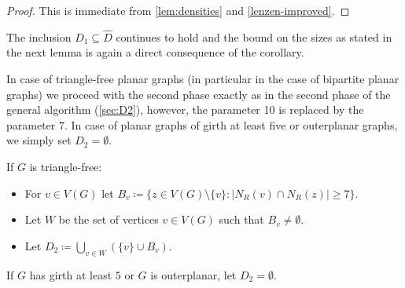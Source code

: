 \begin{proof}
This is immediate from \cref{lem:densities} and \cref{lenzen-improved}.
\end{proof}

The inclusion $D_1\subseteq \hat D$ continues to hold and the bound
on the sizes as stated in the next lemma is again a direct consequence of the corollary.

\smallskip


In case of triangle-free planar graphs (in particular in the case of bipartite
planar graphs) we proceed with the second phase exactly as in the second phase of
the general algorithm (\cref{sec:D2}), however, the parameter 10 is replaced by
the parameter $7$. In  case of planar graphs of girth at least five or outerplanar
graphs, we simply set $D_2=\emptyset$.

\begin{tcolorbox}[colback=red!5!white,colframe=red!50!black]
  If $G$ is triangle-free:

  \begin{itemize}
    \item For $v\in V(G)$ let $B_v\coloneqq \{z\in V(G)\setminus
      \{v\}: |N_R(v)\cap N_R(z)|\geq 7\}$.\smallskip
    \item Let $W$ be the set of vertices $v\in V(G)$ such
      that $B_v \neq \emptyset$.\smallskip
    \item Let $D_2\coloneqq \bigcup\limits_{v\in W} (\{v\}\cup B_v)$.
  \end{itemize}

  If $G$ has girth at least $5$ or $G$ is outerplanar, let $D_2=\emptyset$.
\end{tcolorbox}

